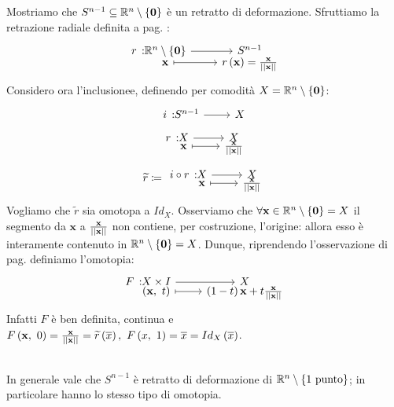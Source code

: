 \begin{example}
	\label{retrattosfera}
	Mostriamo che $S^{n-1}\subseteq \mathbb{R}^n\setminus\left\{\mathbf{0}\right\}$ è un retratto di deformazione. Sfruttiamo la retrazione radiale definita a pag. \pageref{retrazioneradiale}:
		\begin{equation*}
		\funztot{r}{\realset^n\setminus\left\{\mathbf{0}\right\}}{S^{n-1}}{\mathbf{x}}{r\left(\mathbf{x}\right)=\frac{\mathbf{x}}{\labs \mathbf{x}\rabs}}
	\end{equation*}
Considero ora l'inclusionee, definendo per comodità $X=\mathbb{R}^n\setminus\left\{\mathbf{0}\right\}$:
\begin{equation*}
	\funz{i}{S^{n-1}}{X}
\end{equation*}
	\begin{equation*}
		\funztot{r}{X}{X}{\mathbf{x}}{\frac{\mathbf{x}}{\labs \mathbf{x}\rabs}}
	\end{equation*}
			\begin{equation*}
	\widetilde{r}\coloneqq\funztot{ i\circ r}{X}{X}{\mathbf{x}}{\frac{\mathbf{x}}{\labs \mathbf{x}\rabs}}
\end{equation*}
Vogliamo che $\widetilde{r}$ sia omotopa a $Id_X$.
Osserviamo che $\forall \mathbf{x}\in\mathbb{R}^n\setminus\left\{\mathbf{0}\right\}=X$ il segmento da $\mathbf{x}$ a $\frac{\mathbf{x}}{\left|\left| \mathbf{x}\right|\right|}$ non contiene, per costruzione, l'origine: allora esso è interamente contenuto in $\mathbb{R}^n\setminus \left\{\mathbf{0}\right\}=X$. Dunque, riprendendo l'osservazione di pag. \pageref{omotopiasegmento} definiamo l'omotopia:
\begin{equation*}
	\funztot{F}{X\times I}{X}{\left(\mathbf{x},\ t\right)}{\left(1-t\right)\mathbf{x}+t\frac{\mathbf{x}}{\labs \mathbf{x}\rabs}}
\end{equation*}
Infatti $F$ è ben definita, continua e $\mvf{F}{\mathbf{x}}{0}=\frac{\mathbf{x}}{\labs \mathbf{x}\rabs}=\widetilde{r}\left(\overline{x}\right),\ \mvf{F}{x}{1}=\overline{x}=Id_X\left(\overline{x}\right)$.
\end{example}
\begin{corollary}~{}\\
	In generale vale che $S^{n-1}$ è retratto di deformazione di $\mathbb{R}^n\setminus\left\{1\text{ punto}\right\}$; in particolare hanno lo stesso tipo di omotopia.
\end{corollary}
